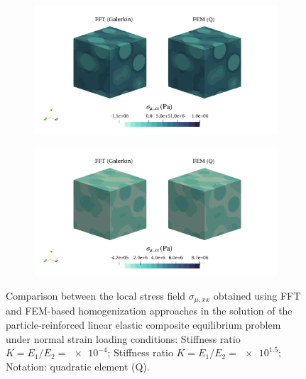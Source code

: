 \begin{figure}[hbt]
  \centering
	\begin{subfigure}[b]{\textwidth}
    \centering
    \includegraphics[width=\textwidth]{figures/linear_3D_ratio_-4_normal_stress_11}
    \caption{}
    \label{subfig:linear_3D_ratio_1_5_normal_stress_11}
  \end{subfigure}
  \begin{subfigure}[b]{\textwidth}
    \centering
    \includegraphics[width=\textwidth]{figures/linear_3D_ratio_1_5_normal_stress_11}
    \caption{}
    \label{subfig:linear_3D_ratio_-4_normal_stress_11}
  \end{subfigure}
  \caption{Comparison between the local stress field \(\sigma_{\mu,xx}\) obtained using
  FFT and FEM-based homogenization approaches in the solution of the particle-reinforced
  linear elastic composite equilibrium problem under normal strain loading conditions:
   Stiffness ratio \(K=E_1/E_2=\num{e-4}\);
   Stiffness ratio \(K=E_1/E_2=\num{e1.5}\);
  Notation: quadratic element (Q).}
\label{fig:linear_3D_stiff_contrast_normal_stress_11}
\end{figure}


